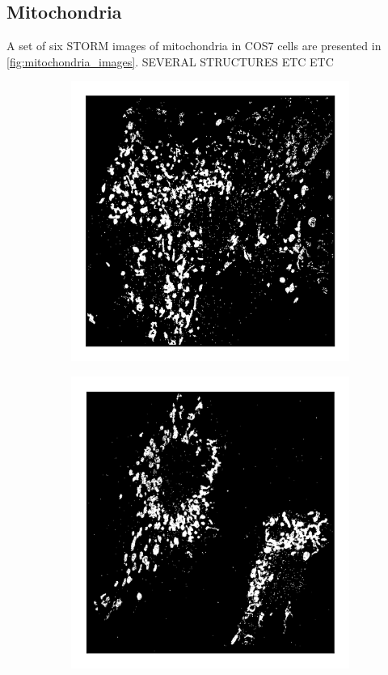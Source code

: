 \subsection{Mitochondria}
A set of six STORM images of mitochondria in COS7 cells are presented in \autoref{fig:mitochondria_images}.
SEVERAL STRUCTURES ETC ETC
%
\begin{figure}
    \begin{subfigure}{0.32\textwidth}
        \includegraphics[width=\textwidth]{figures/mitochondria_image6.png}
        \caption{}
    \end{subfigure}
    \begin{subfigure}{0.32\textwidth}
        \includegraphics[width=\textwidth]{figures/mitochondria_image4.png}

\end{subfigure}
\end{figure}
